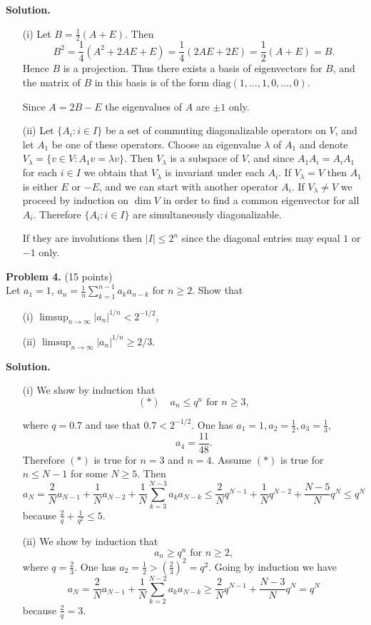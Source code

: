 \documentclass{article}
\begin{document}
\textbf{Solution.}
\begin{itemize}
    \item[(i)] Let $B = \frac{1}{2}(A + E)$. Then
    \[
    B^2 = \frac{1}{4}(A^2 + 2AE + E) = \frac{1}{4}(2AE + 2E) = \frac{1}{2}(A + E) = B.
    \]
    Hence $B$ is a projection. Thus there exists a basis of eigenvectors for $B$, and the matrix of $B$ in this basis is of the form $\text{diag}(1,\ldots, 1,0,\ldots, 0)$.

    Since $A = 2B - E$ the eigenvalues of $A$ are $\pm1$ only.

    \item[(ii)] Let $\{A_i : i \in I\}$ be a set of commuting diagonalizable operators on $V$, and let $A_1$ be one of these operators. Choose an eigenvalue $\lambda$ of $A_1$ and denote $V_{\lambda} = \{v \in V : A_1v = \lambda v\}$. Then $V_{\lambda}$ is a subspace of $V$, and since $A_1A_i = A_iA_1$ for each $i \in I$ we obtain that $V_{\lambda}$ is invariant under each $A_i$. If $V_{\lambda} = V$ then $A_1$ is either $E$ or $-E$, and we can start with another operator $A_i$. If $V_{\lambda} \neq V$ we proceed by induction on $\dim V$ in order to find a common eigenvector for all $A_i$. Therefore $\{A_i : i \in I\}$ are simultaneously diagonalizable.

    If they are involutions then $|I| \leq 2^n$ since the diagonal entries may equal $1$ or $-1$ only.
\end{itemize}

\textbf{Problem 4.} (15 points)\\
Let $a_1 = 1$, $a_n = \frac{1}{n} \sum_{k=1}^{n-1} a_k a_{n-k}$ for $n \geq 2$. Show that
\begin{itemize}
    \item[(i)] $\limsup_{n \to \infty} |a_n|^{1/n} < 2^{-1/2}$,
    \item[(ii)] $\limsup_{n \to \infty} |a_n|^{1/n} \geq 2/3$.
\end{itemize}

\textbf{Solution.}
\begin{itemize}
    \item[(i)] We show by induction that
    \[
    (*) \quad a_n \leq q^n \text{ for } n \geq 3,
    \]

    where $q = 0.7$ and use that $0.7 < 2^{-1/2}$. One has $a_1 = 1, a_2 = \frac{1}{2}, a_3 = \frac{1}{3}$,
    \[
    a_4 = \frac{11}{48}.
    \]
    Therefore $(*)$ is true for $n = 3$ and $n = 4$. Assume $(*)$ is true for $n \leq N - 1$ for some $N \geq 5$. Then
    \[
    a_N = \frac{2}{N} a_{N-1} + \frac{1}{N} a_{N-2} + \frac{1}{N} \sum_{k=3}^{N-3} a_k a_{N-k} \leq \frac{2}{N} q^{N-1} + \frac{1}{N} q^{N-2} + \frac{N-5}{N} q^N \leq q^N
    \]
    because $\frac{2}{q} + \frac{1}{q^2} \leq 5$.

    \item[(ii)] We show by induction that
    \[
    a_n \geq q^n \text{ for } n \geq 2,
    \]
    where $q = \frac{2}{3}$. One has $a_2 = \frac{1}{2} > (\frac{2}{3})^2 = q^2$. Going by induction we have
    \[
    a_N = \frac{2}{N} a_{N-1} + \frac{1}{N} \sum_{k=2}^{N-2} a_k a_{N-k} \geq \frac{2}{N} q^{N-1} + \frac{N-3}{N} q^N = q^N
    \]
    because $\frac{2}{q} = 3$.
\end{itemize}
\end{document}
